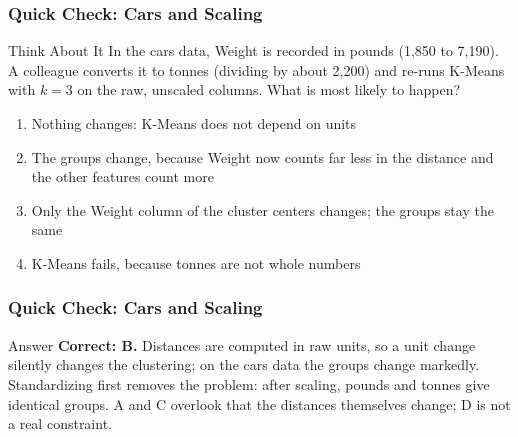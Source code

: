 \begin{frame}[fragile]\frametitle{Quick Check: Cars and Scaling}
\begin{block}{Think About It}
In the cars data, Weight is recorded in pounds (1,850 to 7,190). A colleague converts it to tonnes (dividing by about 2,200) and re-runs K-Means with $k=3$ on the raw, unscaled columns. What is most likely to happen?
\begin{enumerate}
  \item[A.] Nothing changes: K-Means does not depend on units
  \item[B.] The groups change, because Weight now counts far less in the distance and the other features count more
  \item[C.] Only the Weight column of the cluster centers changes; the groups stay the same
  \item[D.] K-Means fails, because tonnes are not whole numbers
\end{enumerate}
\end{block}
\end{frame}

\begin{frame}[fragile]\frametitle{Quick Check: Cars and Scaling}
\begin{block}{Answer}
\textbf{Correct: B.} Distances are computed in raw units, so a unit change silently changes the clustering; on the cars data the groups change markedly. Standardizing first removes the problem: after scaling, pounds and tonnes give identical groups. A and C overlook that the distances themselves change; D is not a real constraint.
\end{block}
\end{frame}
